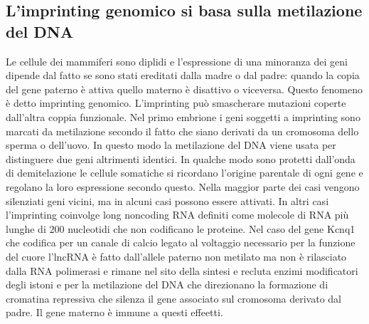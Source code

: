 \subsection{L'imprinting genomico si basa sulla metilazione del DNA}
Le cellule dei mammiferi sono diplidi e l'espressione di una minoranza dei geni dipende dal fatto se sono stati ereditati dalla madre o dal padre: quando la copia del gene paterno \`e
attiva quello materno \`e disattivo o viceversa. Questo fenomeno \`e detto imprinting genomico. L'imprinting pu\`o smascherare mutazioni coperte dall'altra coppia funzionale. Nel primo 
embrione i geni soggetti a imprinting sono marcati da metilazione secondo il fatto che siano derivati da un cromosoma dello sperma o dell'uovo. In questo modo la metilazione del DNA 
viene usata per distinguere due geni altrimenti identici. In qualche modo sono protetti dall'onda di demitelazione le cellule somatiche si ricordano l'origine parentale di ogni gene e 
regolano la loro espressione secondo questo. Nella maggior parte dei casi vengono silenziati geni vicini, ma in alcuni casi possono essere attivati. In altri casi l'imprinting coinvolge
long noncoding RNA definiti come molecole di RNA pi\`u lunghe di $200$ nucleotidi che non codificano le proteine. Nel caso del gene Kcnq1 che codifica per un canale di calcio legato
al voltaggio necessario per la funzione del cuore l'lncRNA \`e fatto dall'allele paterno non metilato ma non \`e rilasciato dalla RNA polimerasi e rimane nel sito della sintesi e recluta
enzimi modificatori degli istoni e per la metilazione del DNA che direzionano la formazione di cromatina repressiva che silenza il gene associato sul cromosoma derivato dal padre. Il 
gene materno \`e immune a questi effeetti. 
